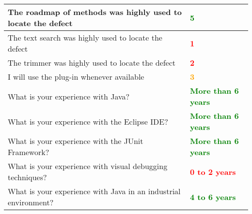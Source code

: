 \begin{table}
\begin{tabular}{m{11cm} | l}
    The roadmap of methods was highly used to locate the defect &
    \textbf{\textcolor{green}{5}} \\ \hline The text search was highly used to locate the defect & \textbf{\textcolor{red}{1}} \\ \hline
    The trimmer was highly used to locate the defect & \textbf{\textcolor{red}{2}} \\ \hline
    I will use the plug-in whenever available & \textbf{\textcolor{orange}{3}} \\ \hline
    What is your experience with Java? & \textbf{\textcolor{green}{More than 6 years}} \\ \hline
    What is your experience with the Eclipse IDE? & \textbf{\textcolor{green}{More than 6 years}} \\ \hline
    What is your experience with the JUnit Framework? & \textbf{\textcolor{green}{More than 6 years}} \\ \hline
    What is your experience with visual debugging techniques? & \textbf{\textcolor{red}{0 to 2 years}} \\ \hline
    What is your experience with Java in an industrial environment? & \textbf{\textcolor{green}{4 to 6 years}}\\
    \hline
\end{tabular}
\label{tab:experiment_3_answers}
\end{table}


